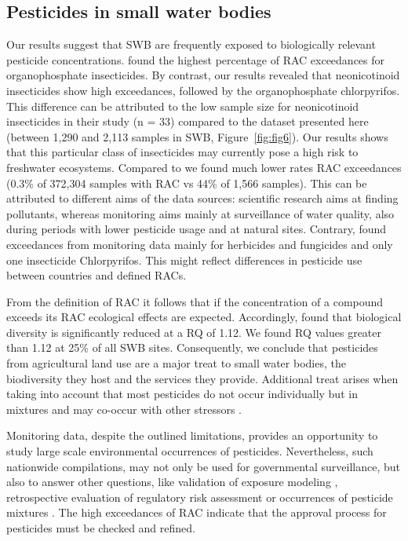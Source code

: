 \documentclass[journal=esthag,manuscript=article]{achemso}
\begin{document}
\subsection{Pesticides in small water bodies}
Our results suggest that SWB are frequently exposed to biologically relevant pesticide concentrations.
\citet{stehle_pesticide_2015} found the highest percentage of RAC exceedances for organophosphate insecticides. 
By contrast, our results revealed that neonicotinoid insecticides show high exceedances, followed by the organophosphate chlorpyrifos. 
This difference can be attributed to the low sample size for neonicotinoid insecticides in their study (n = 33) compared to the dataset presented here (between 1,290 and 2,113 samples in SWB, Figure~\ref{fig:fig6}). 
Our results shows that this particular class of insecticides may currently pose a high risk to freshwater ecosystems.
Compared to \citet{stehle_pesticide_2015} we found much lower rates RAC exceedances (0.3\% of 372,304 samples with RAC vs 44\% of 1,566 samples). 
This can be attributed to different aims of the data sources: scientific research aims at finding pollutants, whereas monitoring aims mainly at surveillance of water quality, also during periods with lower pesticide usage and at natural sites. 
Contrary, \citet{knauer_pesticides_2016} found exceedances from monitoring data mainly for herbicides and fungicides and only one insecticide Chlorpyrifos.
This might reflect differences in pesticide use between countries and defined RACs.

From the definition of RAC it follows that if the concentration of a compound exceeds its RAC ecological effects are expected.
Accordingly, \citet{stehle_agricultural_2015} found that biological diversity is significantly reduced at a RQ of 1.12.
We found RQ values greater than 1.12 at 25\% of all SWB sites. 
Consequently, we conclude that pesticides from agricultural land use are a major treat to small water bodies, the biodiversity they host and the services they provide. 
Additional treat arises when taking into account that most pesticides do not occur individually but in mixtures \cite{schreiner_pesticide_2016} and may co-occur with other stressors \citep{schafer_contribution_2016}.

Monitoring data, despite the outlined limitations, provides an opportunity to study large scale environmental occurrences of pesticides.
Nevertheless, such nationwide compilations, may not only be used for governmental surveillance, but also to answer other questions, like validation of exposure modeling \cite{knabel_fungicide_2014}, retrospective evaluation of regulatory risk assessment \citep{knauer_pesticides_2016,stehle_pesticide_2015}or occurrences of pesticide mixtures \cite{schreiner_pesticide_2016}. 
The high exceedances of RAC indicate that the approval process for pesticides must be checked and refined.
\end{document}
